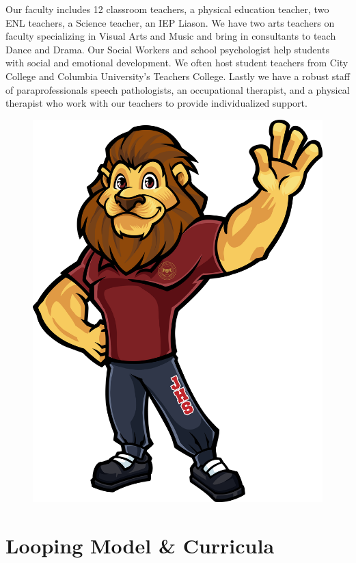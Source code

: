\documentclass[11pt, letterpaper]{article}
\begin{document}
Our faculty includes 12 classroom teachers, a physical education teacher, two ENL teachers, a Science teacher, an IEP Liason. We have two arts teachers on faculty specializing in Visual Arts and Music and bring in consultants to teach Dance and Drama. Our Social Workers  and school psychologist help students with social and emotional development. We often host student teachers from City College and Columbia University’s Teachers College. Lastly we have a robust staff of paraprofessionals speech pathologists, an occupational therapist, and a physical therapist who work with our teachers to provide individualized support.
\begin{figure}
\includegraphics[width=.85\linewidth]{logohim.png}
\end{figure}
\section{Looping Model \& Curricula}
\end{document}
